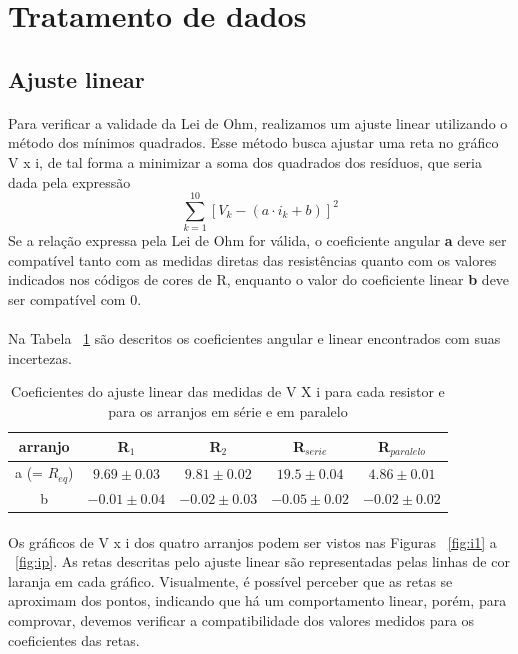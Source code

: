 \documentclass[11pt,a4paper]{article}
\begin{document}
  \pagebreak
  \section{Tratamento de dados}

    \subsection{Ajuste linear}
      \paragraph{}
      Para verificar a validade da Lei de Ohm, realizamos um ajuste linear utilizando o método dos mínimos quadrados. Esse método busca ajustar uma reta no gráfico V x i, de tal forma a minimizar a soma dos quadrados dos resíduos, que seria dada pela expressão $$\sum\limits_{k=1}^{10}[V_k - (a \cdot i_k + b)]^2$$ Se a relação expressa pela Lei de Ohm for válida, o coeficiente angular \textbf{a} deve ser compatível tanto com as medidas diretas das resistências quanto com os valores indicados nos códigos de cores de R, enquanto o valor do coeficiente linear \textbf{b} deve ser compatível com 0.
      \paragraph{}
      Na Tabela ~\ref{tab:mmq} são descritos os coeficientes angular e linear encontrados com suas incertezas.
     
      \begin{table}[htb!]
        \centering
        \begin{tabular}{c|c|c|c|c}
          \toprule
          arranjo        & R$_1$   & R$_2$   & R$_{serie}$  & R$_{paralelo}$ \\
          \midrule
          a (= $R_{eq}$) & $ 9.69 \pm 0.03$ & $ 9.81 \pm 0.02$  & $ 19.5 \pm 0.04$  & $ 4.86 \pm 0.01$  \\
          b              & $-0.01 \pm 0.04$ & $-0.02 \pm 0.03$  & $-0.05 \pm 0.02$  & $-0.02 \pm 0.02$  \\
          \bottomrule
        \end{tabular}
        \caption{Coeficientes do ajuste linear das medidas de V X i para cada resistor e para os arranjos em série e em paralelo}
        \label{tab:mmq}
      \end{table} 
      
      \paragraph{}
      Os gráficos de V x i dos quatro arranjos podem ser vistos nas Figuras ~\ref{fig:i1} a ~\ref{fig:ip}. As retas descritas pelo ajuste linear são representadas pelas linhas de cor laranja em cada gráfico. Visualmente, é possível perceber que as retas se aproximam dos pontos, indicando que há um comportamento linear, porém, para comprovar, devemos verificar a compatibilidade dos valores medidos para os coeficientes das retas.
  
\end{document}

